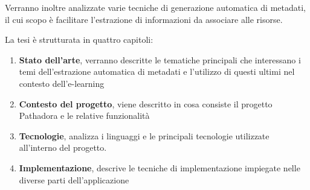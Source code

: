 \vspace{5mm}

Verranno inoltre analizzate varie tecniche di generazione automatica di metadati, il cui scopo è facilitare l'estrazione di informazioni da associare alle risorse.

\vspace{5mm}

La tesi è strutturata in quattro capitoli:
\begin{enumerate}
\item \textbf{Stato dell'arte}, verranno descritte le tematiche principali che interessano i temi dell'estrazione automatica di metadati e l'utilizzo di questi ultimi nel contesto dell'e-learning
\item \textbf{Contesto del progetto}, viene descritto in cosa consiste il progetto Pathadora e le relative funzionalità
\item \textbf{Tecnologie}, analizza i linguaggi e le principali tecnologie utilizzate all’interno del progetto.
\item \textbf{Implementazione}, descrive le tecniche di implementazione impiegate nelle diverse parti dell’applicazione
\end{enumerate}

\clearpage{\pagestyle{empty}\cleardoublepage}
